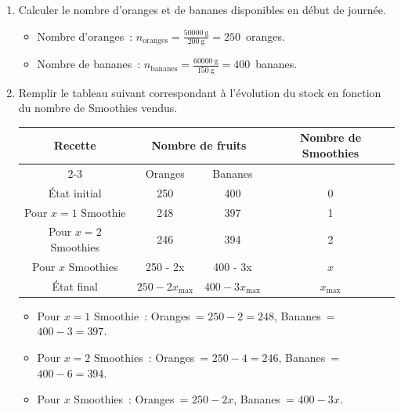 \documentclass[10pt,a4paper]{article}
\newcommand{\correction}[1]{\textcolor{correction}{#1}}
\begin{document}
\begin{enumerate}
    \item Calculer le nombre d'oranges et de bananes disponibles en début de journée.
    \correction{
        \begin{itemize}
            \item Nombre d'oranges~: $n_{\text{oranges}} = \frac{\SI{50000}{\gram}}{\SI{200}{\gram}} = 250$~oranges.
            \item Nombre de bananes~: $n_{\text{bananes}} = \frac{\SI{60000}{\gram}}{\SI{150}{\gram}} = 400$~bananes.
        \end{itemize}
    }

    \item Remplir le tableau suivant correspondant à l'évolution du stock en fonction du nombre de Smoothies vendus.
 
    \begin{center}
    \begin{tabular}{|c|c|c|c|}
    \hline
    \multirow{2}{*}{Recette} & \multicolumn{2}{c|}{Nombre de fruits} & \multirow{2}{*}{Nombre de Smoothies} \\
    \cline{2-3}
    & Oranges & Bananes & \\
    \hline
    État initial & \correction{250} & \correction{400} & 0 \\
    \hline
    Pour $x = 1$ Smoothie & \correction{248} & \correction{397} & 1 \\
    \hline
    Pour $x = 2$ Smoothies & \correction{246} & \correction{394} & 2 \\
    \hline
    Pour $x$ Smoothies & \correction{250 - 2x} & \correction{400 - 3x} & $x$ \\
    \hline
    État final & \correction{$250 - 2x_{\text{max}}$} & \correction{$400 - 3x_{\text{max}}$} & $x_{\text{max}}$ \\
    \hline
    \end{tabular}
    \end{center}

    \correction{
        \begin{itemize}
            \item Pour $x = 1$ Smoothie~: Oranges~= $250 - 2 = 248$, Bananes~= $400 - 3 = 397$.
            \item Pour $x = 2$ Smoothies~: Oranges~= $250 - 4 = 246$, Bananes~= $400 - 6 = 394$.
            \item Pour $x$ Smoothies~: Oranges~= $250 - 2x$, Bananes~= $400 - 3x$.
        \end{itemize}
    }


\end{enumerate}
\end{document}
